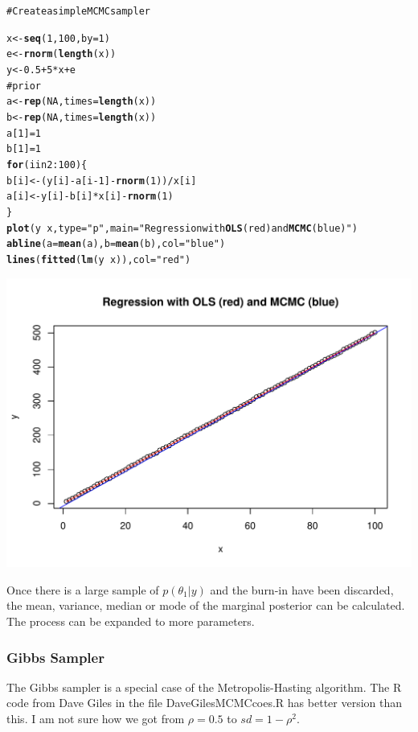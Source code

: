 \documentclass[12pt, a4paper, oneside]{article}\usepackage{graphicx, color}
\makeatletter
\def\maxwidth{ %
  \ifdim\Gin@nat@width>\linewidth
    \linewidth
  \else
    \Gin@nat@width
  \fi
}
\newcommand{\hlfunctioncall}[1]{\textcolor[rgb]{0.501960784313725,0,0.329411764705882}{\textbf{#1}}}%
\newcommand{\hlstring}[1]{\textcolor[rgb]{0.6,0.6,1}{#1}}%
\newcommand{\hlcomment}[1]{\textcolor[rgb]{0.180392156862745,0.6,0.341176470588235}{#1}}%
\newenvironment{kframe}{%
 \def\at@end@of@kframe{}%
 \ifinner\ifhmode%
  \def\at@end@of@kframe{\end{minipage}}%
  \begin{minipage}{\columnwidth}%
 \fi\fi%
 \def\FrameCommand##1{\hskip\@totalleftmargin \hskip-\fboxsep
 \colorbox{shadecolor}{##1}\hskip-\fboxsep
     \hskip-\linewidth \hskip-\@totalleftmargin \hskip\columnwidth}%
 \MakeFramed {\advance\hsize-\width
   \@totalleftmargin\z@ \linewidth\hsize
   \@setminipage}}%
 {\par\unskip\endMakeFramed%
 \at@end@of@kframe}
\newenvironment{knitrout}{}{} %
\makeatother
\begin{document}
\begin{knitrout}
\color{fgcolor}\begin{kframe}
\begin{alltt}
\hlcomment{# Create a simple MCMC sampler}

x <- \hlfunctioncall{seq}(1, 100, by = 1)
e <- \hlfunctioncall{rnorm}(\hlfunctioncall{length}(x))
y <- 0.5 + 5 * x + e
\hlcomment{# prior}
a <- \hlfunctioncall{rep}(NA, times = \hlfunctioncall{length}(x))
b <- \hlfunctioncall{rep}(NA, times = \hlfunctioncall{length}(x))
a[1] = 1
b[1] = 1
\hlfunctioncall{for} (i in 2:100) \{
    b[i] <- (y[i] - a[i - 1] - \hlfunctioncall{rnorm}(1))/x[i]
    a[i] <- y[i] - b[i] * x[i] - \hlfunctioncall{rnorm}(1)
\}
\hlfunctioncall{plot}(y ~ x, type = \hlstring{"p"}, main = \hlstring{"Regression with \hlfunctioncall{OLS} (red) and \hlfunctioncall{MCMC} (blue)"})
\hlfunctioncall{abline}(a = \hlfunctioncall{mean}(a), b = \hlfunctioncall{mean}(b), col = \hlstring{"blue"})
\hlfunctioncall{lines}(\hlfunctioncall{fitted}(\hlfunctioncall{lm}(y ~ x)), col = \hlstring{"red"})
\end{alltt}
\end{kframe}
\includegraphics[width=\maxwidth]{figure/MCMC} 

\end{knitrout}


Once there is a large sample of $p(\theta_1|y)$ and the burn-in have been discarded, the mean, variance, median or mode of the marginal posterior can be calculated.  The process can be expanded to more parameters. 

\subsubsection{Gibbs Sampler}
The Gibbs sampler is a special case of the Metropolis-Hasting algorithm. 
The R code from Dave Giles in the file DaveGilesMCMCcoes.R has better version than this. I am not sure how we got from $\rho = 0.5$ to $sd = 1-\rho^2$. 
\end{document}
